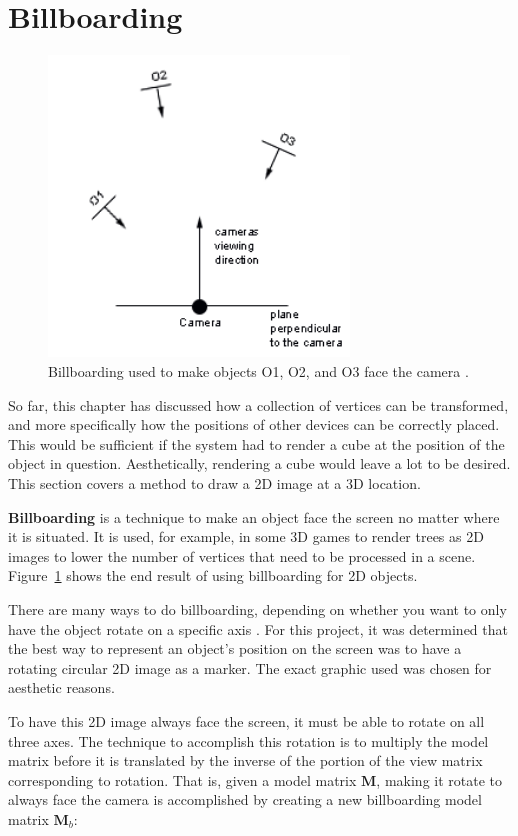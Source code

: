 \section{Billboarding}
\begin{figure}
	\centering
	\includegraphics[width=8cm]{Figures/Billboarding.png}
	\decoRule
	\caption{Billboarding used to make objects O1, O2, and O3 face the camera \cite{Lighthouse3D}.}
	\label{fig:Billboarding}
\end{figure}
So far, this chapter has discussed how a collection of vertices can be transformed, and more specifically how the positions of other devices can be correctly placed. This would be sufficient if the system had to render a cube at the position of the object in question. Aesthetically, rendering a cube would leave a lot to be desired. This section covers a method to draw a 2D image at a 3D location.

\textbf{Billboarding} is a technique to make an object face the screen no matter where it is situated. It is used, for example, in some 3D games to render trees as 2D images to lower the number of vertices that need to be processed in a scene. Figure~\ref{fig:Billboarding} shows the end result of using billboarding for 2D objects.

There are many ways to do billboarding, depending on whether you want to only have the object rotate on a specific axis \cite{Lighthouse3D}. For this project, it was determined that the best way to represent an object's position on the screen was to have a rotating circular 2D image as a marker. The exact graphic used was chosen for aesthetic reasons.

To have this 2D image always face the screen, it must be able to rotate on all three axes. The technique to accomplish this rotation is to multiply the model matrix before it is translated by the inverse of the portion of the view matrix corresponding to rotation. That is, given a model matrix $\textbf{M}$, making it rotate to always face the camera is accomplished by creating a new billboarding model matrix $\textbf{M}_b$:

